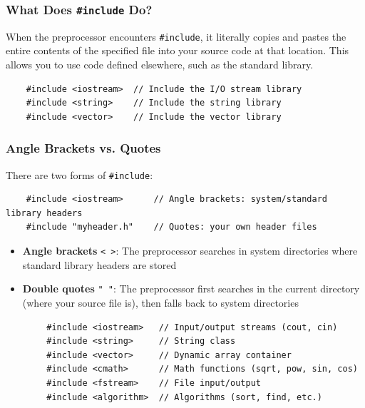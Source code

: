 \subsubsection{What Does \texttt{\#include} Do?}

When the preprocessor encounters \texttt{\#include}, it literally copies and pastes the entire contents of the specified file into your source code at that location. This allows you to use code defined elsewhere, such as the standard library.

\begin{lstlisting}
	#include <iostream>  // Include the I/O stream library
	#include <string>    // Include the string library
	#include <vector>    // Include the vector library
\end{lstlisting}

\subsubsection{Angle Brackets vs. Quotes}

There are two forms of \texttt{\#include}:

\begin{lstlisting}
	#include <iostream>      // Angle brackets: system/standard library headers
	#include "myheader.h"    // Quotes: your own header files
\end{lstlisting}

\begin{itemize}
	\item \textbf{Angle brackets} \texttt{< >}: The preprocessor searches in system directories where standard library headers are stored
	\item \textbf{Double quotes} \texttt{" "}: The preprocessor first searches in the current directory (where your source file is), then falls back to system directories
\end{itemize}

\begin{example}{\leavevmode}
	
	\begin{lstlisting}
		#include <iostream>   // Input/output streams (cout, cin)
		#include <string>     // String class
		#include <vector>     // Dynamic array container
		#include <cmath>      // Math functions (sqrt, pow, sin, cos)
		#include <fstream>    // File input/output
		#include <algorithm>  // Algorithms (sort, find, etc.)
	\end{lstlisting}
\end{example}

